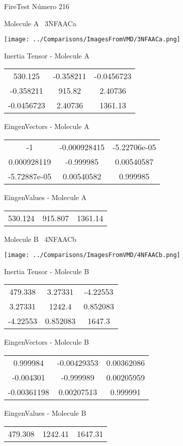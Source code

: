 \vtab[-3cm]
\begin{center}
{\large FireTest \tab Número 216}
\end{center}
\begin{multicols}{2}
\begin{center}

Molecule A \
3NFAACa

\texttt{[image: ../Comparisons/ImagesFromVMD/3NFAACa.png]}

Inertia Tensor - Molecule A \\
\begin{tabular}{|c c c|}
530.125	 & 	-0.358211	 & 	-0.0456723	 \\
-0.358211	 & 	915.82	 & 	2.40736	 \\
-0.0456723	 & 	2.40736	 & 	1361.13
\end{tabular}

\vtab
 EingenVectors - Molecule A     \\
\begin{tabular}{|c c c|}
-1	 & 	-0.000928415	 & 	-5.22706e-05	 \\
0.000928119	 & 	-0.999985	 & 	0.00540587	 \\
-5.72887e-05	 & 	0.00540582	 & 	0.999985
\end{tabular}

\vtab
 EingenValues - Molecule A     \\
\begin{tabular}{|c c c|}
530.124	 & 	915.807	 & 	1361.14	 \\
\end{tabular}
\columnbreak

Molecule B \
4NFAACb

\texttt{[image: ../Comparisons/ImagesFromVMD/4NFAACb.png]}

Inertia Tensor - Molecule B \\
\begin{tabular}{|c c c|}
479.338	 & 	3.27331	 & 	-4.22553	 \\
3.27331	 & 	1242.4	 & 	0.852083	 \\
-4.22553	 & 	0.852083	 & 	1647.3
\end{tabular}

\vtab
 EingenVectors - Molecule B     \\
\begin{tabular}{|c c c|}
0.999984	 & 	-0.00429353	 & 	0.00362086	 \\
-0.004301	 & 	-0.999989	 & 	0.00205959	 \\
-0.00361198	 & 	0.00207513	 & 	0.999991
\end{tabular}

\vtab
 EingenValues - Molecule B     \\
\begin{tabular}{|c c c|}
479.308	 & 	1242.41	 & 	1647.31	 \\
\end{tabular}

\end{center}
\end{multicols}


